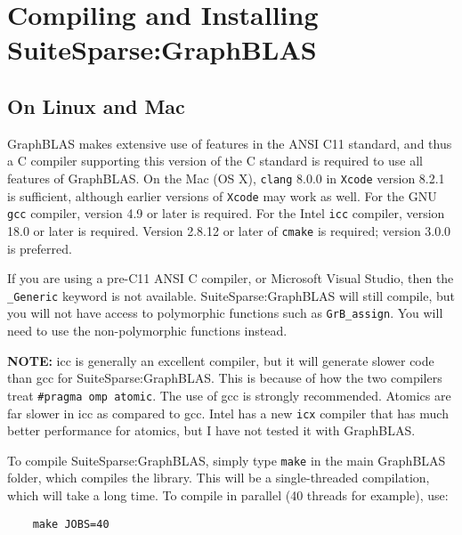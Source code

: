\documentclass[12pt]{article}
\begin{document}
\newpage
\section{Compiling and Installing SuiteSparse:GraphBLAS}
\label{sec:install}

\subsection{On Linux and Mac}

GraphBLAS makes extensive use of features in the ANSI C11 standard, and thus a
C compiler supporting this version of the C standard is required to use
all features of GraphBLAS.  On the Mac
(OS X), \verb'clang' 8.0.0 in \verb'Xcode' version 8.2.1 is sufficient,
although earlier versions of \verb'Xcode' may work as well.  For the GNU
\verb'gcc' compiler, version 4.9 or later is required.  For the Intel
\verb'icc' compiler, version 18.0 or later is required.  Version 2.8.12 or
later of \verb'cmake' is required; version 3.0.0 is preferred.

If you are using a pre-C11 ANSI C compiler, or Microsoft Visual Studio,
then the \verb'_Generic' keyword is not available.  SuiteSparse:GraphBLAS
will still compile, but you will not have access to polymorphic functions
such as \verb'GrB_assign'.  You will need to use the non-polymorphic functions
instead.

\begin{alert}
{\bf NOTE:} icc is generally an excellent compiler, but it will generate slower
code than gcc for SuiteSparse:GraphBLAS.  This is because of how the two
compilers treat \verb'#pragma omp atomic'. The use of gcc is strongly
recommended.  Atomics are far slower in icc as compared to gcc.
Intel has a new \verb'icx' compiler that has much better performance for
atomics, but I have not tested it with GraphBLAS.
\end{alert}

To compile SuiteSparse:GraphBLAS, simply type \verb'make'
in the main GraphBLAS folder, which compiles the library.  This will be a
single-threaded compilation, which will take a long time.  To compile in 
parallel (40 threads for example), use:

    {\small
    \begin{verbatim}
    make JOBS=40 \end{verbatim} }
\end{document}
